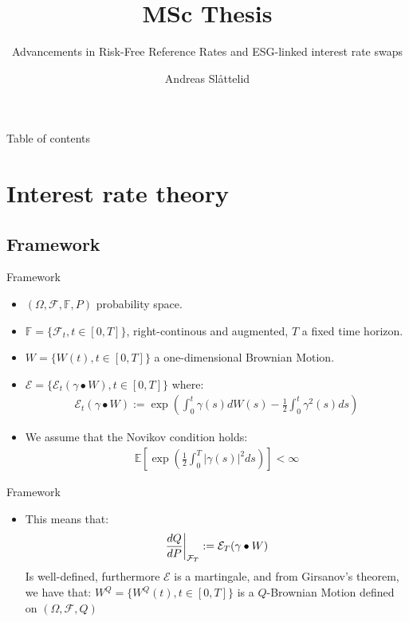 \documentclass[UKenglish]{beamer}
\author{Andreas Slåttelid}
\title{MSc Thesis}
\subtitle{Advancements in Risk-Free Reference Rates and ESG-linked interest rate swaps}
\newcommand{\E}{\mathbb{E}}  %
\newcommand{\F}{\mathcal{F}} %
\begin{document}


%
%
\begin{frame}{Table of contents}
    \tableofcontents[currentsection]
\end{frame}


\section{Interest rate theory}
\SectionPage
\subsection{Framework}

\begin{frame}{Framework}
\begin{itemize}
    \item $(\Omega, \F, \mathbb{F}, P)$ probability space.  
    \item $\mathbb{F} = \{\F_{t}, t \in [0,T]\}$, right-continous and augmented, $T$ a fixed time horizon. 
    \item $W = \{W(t), t\in [0,T]\}$ a one-dimensional Brownian Motion. 
    \item $\mathcal{E} = \{\mathcal{E}_{t}(\gamma \bullet W), t \in [0,T]\}$ where: 
    \begin{align*}
     \mathcal{E}_{t}(\gamma \bullet W) := \exp\left(
     \int_{0}^{t}\gamma(s)dW(s) -\frac{1}{2}\int_{0}^{t}\gamma^{2}(s)ds
     \right)   
    \end{align*}
    \item We assume that the Novikov condition holds:
    \begin{align*}
     \E\left[
     \exp\left(
     \frac{1}{2}\int_{0}^{T}|\gamma(s)|^{2}ds
     \right)
     \right] < \infty   
    \end{align*}
\end{itemize}
\end{frame}


\begin{frame}{Framework}
\begin{itemize}
    \item This means that: 
    \begin{align*}
    \frac{dQ}{dP}\bigg{|}_{\F_{T}} := \mathcal{E}_{T}(\gamma \bullet W)   
    \end{align*}
    Is well-defined, furthermore $\mathcal{E}$ is a martingale, and from Girsanov's theorem, we have that: $W^{Q} = \{W^{Q}(t), t\in [0,T]\} $ is a $Q$-Brownian Motion defined on $(\Omega, \F, Q)$
\end{itemize} 
\end{frame}
\end{document}
